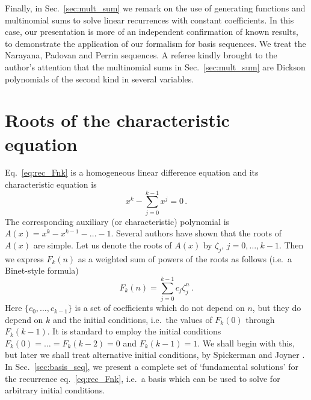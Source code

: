 \documentclass[review]{elsarticle}
\theoremstyle{plain}
\begin{document}
Finally, in Sec.~\ref{sec:mult_sum} we remark on the use of generating functions and multinomial sums to solve linear recurrences with constant coefficients.
In this case, our presentation is more of an independent confirmation of known results,
to demonstrate the application of our formalism for basis sequences.
We treat the Narayana, Padovan and Perrin sequences.
A referee kindly brought to the author's attention that the multinomial sums in Sec.~\ref{sec:mult_sum}
are Dickson polynomials of the second kind in several variables.

\setcounter{equation}{0}
\section{Roots of the characteristic equation}\label{sec:fusscat}
Eq.~\eqref{eq:rec_Fnk} is a homogeneous linear difference equation and its characteristic equation is
\begin{equation}
\label{eq:aux_eq}
x^k - \sum_{j=0}^{k-1}x^j = 0 \,.
\end{equation}
The corresponding auxiliary (or characteristic) polynomial is
$A(x) = x^k -x^{k-1} -\dots -1$.
Several authors \cite{Wolfram,Miles,Miller} have shown that the roots of $A(x)$ are simple.
Let us denote the roots of $A(x)$ by $\zeta_j$, $j=0,\dots,k-1$.
Then we express $F_k(n)$ as a weighted sum of powers of the roots as follows
(i.e.~a Binet-style formula)
\begin{equation}
\label{eq:Fn_sum_roots}
F_k(n) = \sum_{j=0}^{k-1} c_j\zeta_j^n \,.
\end{equation}
Here $\{c_0,\dots,c_{k-1}\}$ is a set of coefficients which do not depend on $n$,
but they do depend on $k$ and the initial conditions, i.e.~the values of $F_k(0)$ through $F_k(k-1)$.
It is standard to employ the initial conditions $F_k(0)=\dots=F_k(k-2)=0$ and $F_k(k-1)=1$.
We shall begin with this, but later we shall treat alternative initial conditions,
by Spickerman and Joyner \cite{SpickermanJoyner}.
In Sec.~\ref{sec:basis_seq}, we present a complete set of `fundamental solutions' for the recurrence eq.~\eqref{eq:rec_Fnk},
i.e.~a basis which can be used to solve for arbitrary initial conditions.
\end{document}
